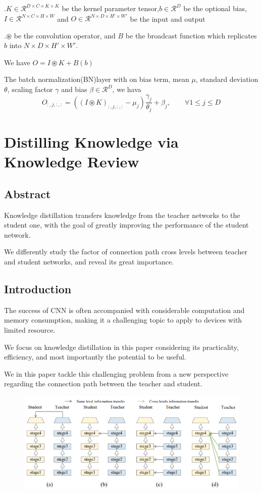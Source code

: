 \documentclass[11pt]{article}
\begin{document}
.$K\in \mathcal{R}^{D\times C\times K\times K}$ be the kernel parameter tensor,$b\in \mathcal{R}^D$ be the optional bias, $I\in \mathcal{R}^{N\times C\times H\times W}$ and $O\in \mathcal{R}^{N\times D\times H'\times W'}$ be the input and output

.$\circledast$ be the convolution operator, and $B$ be the broadcast function which replicates $b$ into $N\times D\times H'\times W'$.

We have $O = I\circledast K + B(b)$

The batch normalization(BN)layer with on bias term, mean $\mu$, standard deviation $\theta$, scaling factor $\gamma$ and bias $\beta \in \mathcal{R}^D$, we hava 
$$O_{:,j,:,:} = ((I\circledast K)_{:,j,:,:}-\mu_j)\frac{\gamma_j}{\theta_j} + \beta_j, \qquad \forall 1\leq j\leq D$$

\section{Distilling Knowledge via Knowledge Review}
\subsection{Abstract}
Knowledge distillation transfers knowledge from the teacher networks to the student one, with the goal of greatly improving the performance of the student network.

We differently study the factor of connection path cross levels between teacher and student networks, and reveal its great importance.

\subsection{Introduction}
The success of CNN is often accompanied with considerable computation and memory consumption, making it a challenging topic to apply to devices with limited resource.

We focus on knowledge distillation in this paper considering its practicality, efficiency, and most importantly the potential to be useful.

We in this paper tackle this challenging problem from a new perspective regarding the connection path between the teacher and student.

\begin{figure}[H]
	\centering
	\includegraphics[scale = 0.5]{99}
\end{figure}
\end{document}
